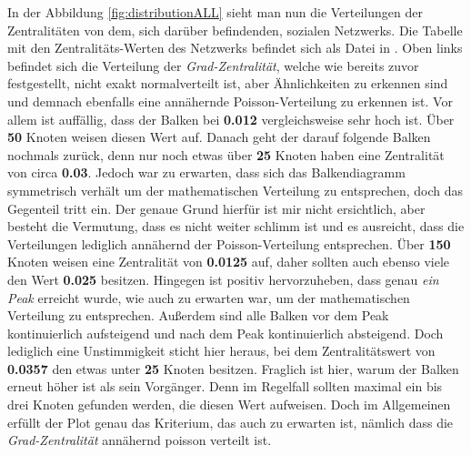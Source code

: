 In der Abbildung \ref{fig:distributionALL} sieht man nun die Verteilungen der Zentralitäten von dem, sich darüber befindenden, sozialen Netzwerks. Die Tabelle mit den Zentralitäts-Werten des Netzwerks befindet sich als Datei in \cite{TZ}. Oben links befindet sich die Verteilung der \textit{Grad-Zentralität}, welche wie bereits zuvor festgestellt, nicht exakt normalverteilt ist, aber Ähnlichkeiten zu erkennen sind und demnach ebenfalls eine annähernde Poisson-Verteilung zu erkennen ist. Vor allem ist auffällig, dass der Balken bei \textbf{0.012} vergleichsweise sehr hoch ist. Über \textbf{50} Knoten weisen diesen Wert auf. Danach geht der darauf folgende Balken nochmals zurück, denn nur noch etwas über \textbf{25} Knoten haben eine Zentralität von circa \textbf{0.03}. Jedoch war zu erwarten, dass sich das Balkendiagramm symmetrisch verhält um der mathematischen Verteilung zu entsprechen, doch das Gegenteil tritt ein. Der genaue Grund hierfür ist mir nicht ersichtlich, aber besteht die Vermutung, dass es nicht weiter schlimm ist und es ausreicht, dass die Verteilungen lediglich annähernd der Poisson-Verteilung entsprechen. Über \textbf{150} Knoten weisen eine Zentralität von \textbf{0.0125} auf, daher sollten auch ebenso viele den Wert \textbf{0.025} besitzen. Hingegen ist positiv hervorzuheben, dass genau \textit{ein Peak} erreicht wurde, wie auch zu erwarten war, um der mathematischen Verteilung zu entsprechen. Außerdem sind alle Balken vor dem Peak kontinuierlich aufsteigend und nach dem Peak kontinuierlich absteigend. Doch lediglich eine Unstimmigkeit sticht hier heraus, bei dem Zentralitätswert von \textbf{0.0357} den etwas unter \textbf{25} Knoten besitzen. Fraglich ist hier, warum der Balken erneut höher ist als sein Vorgänger. Denn im Regelfall sollten maximal ein bis drei Knoten gefunden werden, die diesen Wert aufweisen. Doch im Allgemeinen erfüllt der Plot genau das Kriterium, das auch zu erwarten ist, nämlich dass die \textit{Grad-Zentralität} annähernd poisson verteilt ist.\\


